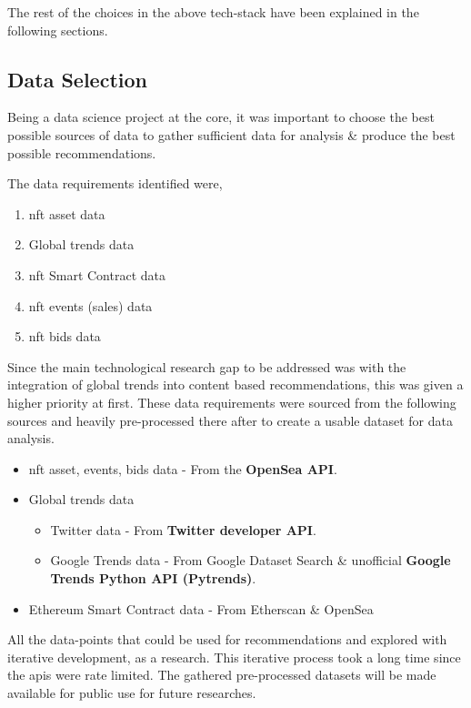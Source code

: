 \noindent The rest of the choices in the above tech-stack have been explained in the following sections.

\subsection{Data Selection}
Being a data science project at the core, it was important to choose the best possible sources of data to gather sufficient data for analysis \& produce the best possible recommendations.

The data requirements identified were,
\begin{enumerate}
\item \gls{nft} asset data
\item Global trends data
\item \gls{nft} Smart Contract data
\item \gls{nft} events (sales) data
\item \gls{nft} bids data
\end{enumerate}

Since the main technological research gap to be addressed was with the integration of global trends into content based recommendations, this was given a higher priority at first.
These data requirements were sourced from the following sources and heavily pre-processed there after to create a usable dataset for data analysis. 

\begin{itemize}
\item \gls{nft} asset, events, bids data - From the \textbf{OpenSea API}.
\item Global trends data
\begin{itemize}
    \item Twitter data - From \textbf{Twitter developer API}.
    \item Google Trends data - From Google Dataset Search \& unofficial \textbf{Google Trends Python API (Pytrends)}.
\end{itemize}
\item Ethereum Smart Contract data - From Etherscan \& OpenSea
\end{itemize}


All the data-points that could be used for recommendations and explored with iterative development, as a research. This iterative process took a long time since the \gls{api}s were rate limited. The gathered pre-processed datasets will be made available for public use for future researches.

